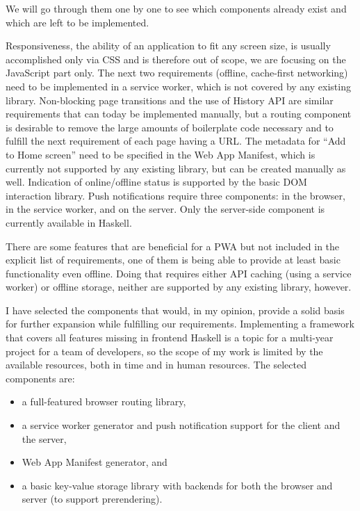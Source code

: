 \documentclass[english,zadani,odsaz]{fitthesis}
\begin{document}
We will go through them one by one to see which components already exist and
which are left to be implemented.

Responsiveness, the ability of an application to fit any screen size, is usually
accomplished only via CSS and is therefore out of scope, we are focusing on the
JavaScript part only. The next two requirements (offline, cache-first
networking) need to be implemented in a service worker, which is not covered by
any existing library. Non-blocking page transitions and the use of History API
are similar requirements that can today be implemented manually, but a routing
component is desirable to remove the large amounts of boilerplate code necessary
and to fulfill the next requirement of each page having a URL. The metadata for
``Add to Home screen'' need to be specified in the Web App Manifest, which is
currently not supported by any existing library, but can be created manually as
well. Indication of online/offline status is supported by the basic DOM
interaction library. Push notifications require three components: in the
browser, in the service worker, and on the server. Only the server-side
component is currently available in Haskell.

There are some features that are beneficial for a PWA but not included in the
explicit list of requirements, one of them is being able to provide at least
basic functionality even offline. Doing that requires either API caching (using
a service worker) or offline storage, neither are supported by any existing
library, however.

I have selected the components that would, in my opinion, provide a solid basis
for further expansion while fulfilling our requirements. Implementing a
framework that covers all features missing in frontend Haskell is a topic for a
multi-year project for a team of developers, so the scope of my work is limited
by the available resources, both in time and in human resources. The selected
components are:

\begin{itemize}
\item a full-featured browser routing library,
\item a service worker generator and push notification support for the client and
the server,
\item Web App Manifest generator, and
\item a basic key-value storage library with backends for both the browser and
server (to support prerendering).
\end{itemize}
\end{document}
